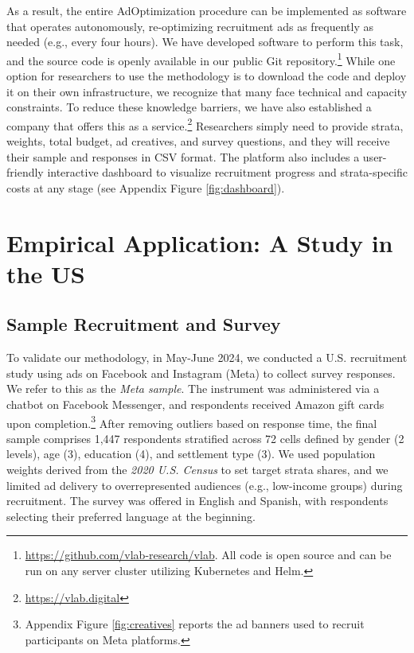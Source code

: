 \documentclass[letterpaper,12pt]{article}
\theoremstyle{proposition}
\begin{document}
As a result, the entire AdOptimization procedure can be implemented as software that operates autonomously, re-optimizing recruitment ads as frequently as needed (e.g., every four hours). We have developed software to perform this task, and the source code is openly available in our public Git repository.\footnote{\url{https://github.com/vlab-research/vlab}. All code is open source and can be run on any server cluster utilizing Kubernetes and Helm.} While one option for researchers to use the methodology is to download the code and deploy it on their own infrastructure, we recognize that many face technical and capacity constraints. To reduce these knowledge barriers,  we have also established a company that offers this as a service.\footnote{\url{https://vlab.digital}} Researchers simply need to provide strata, weights, total budget, ad creatives, and survey questions, and they will receive their sample and responses in CSV format. The platform also includes a user-friendly interactive dashboard to visualize recruitment progress and strata-specific costs at any stage (see Appendix Figure \ref{fig:dashboard}).





\section*{Empirical Application: A Study in the US}

\subsection*{Sample Recruitment and Survey}

To validate our methodology, in May-June 2024, we conducted a U.S. recruitment study using ads on Facebook and Instagram (Meta) to collect survey responses. We refer to this as the \textit{Meta sample}. The instrument was administered via a chatbot on Facebook Messenger, and respondents received Amazon gift cards upon completion.\footnote{Appendix Figure \ref{fig:creatives} reports the ad banners used to recruit participants on Meta platforms.} After removing outliers based on response time, the final sample comprises 1{,}447 respondents stratified across 72 cells defined by gender (2 levels), age (3), education (4), and settlement type (3). We used population weights derived from the \textit{2020 U.S. Census} to set target strata shares, and we limited ad delivery to overrepresented audiences (e.g., low-income groups) during recruitment. The survey was offered in English and Spanish, with respondents selecting their preferred language at the beginning. 
\end{document}
